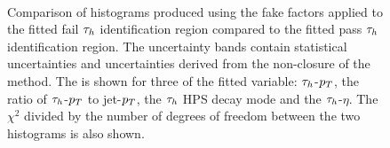 \begin{figure}[!hbtp]
\centering
     \\
\caption[Plots of the validation of the ML fake factor fits.]{Comparison of histograms produced using the fake factors applied to the fitted fail $\tau_{h}$ identification region compared to the fitted pass $\tau_{h}$ identification region. The uncertainty bands contain statistical uncertainties and uncertainties derived from the non-closure of the method. The is shown for three of the fitted variable: $\tau_{h}$-$p_{T}$, the ratio of $\tau_{h}$-$p_{T}$ to jet-$p_{T}$, the $\tau_{h}$ HPS decay mode and the $\tau_{h}$-$\eta$. The $\chi^2$ divided by the number of degrees of freedom between the two histograms is also shown.}
\label{fig:4tau_ff_closure}
\end{figure}

